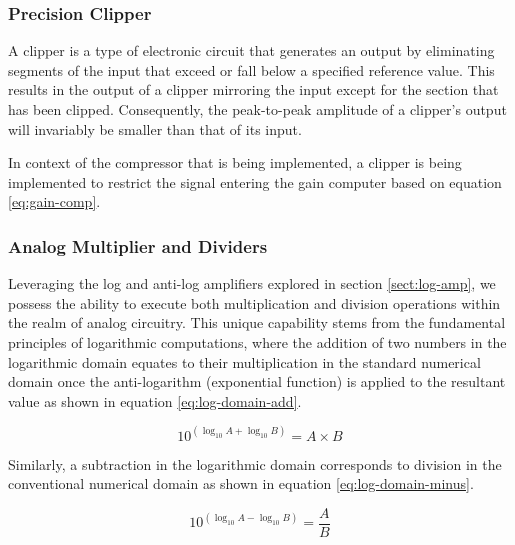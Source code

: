 \documentclass[10pt]{article}
\begin{document}
\begin{multicols*}{2}
                \subsubsection{Precision Clipper}
                    A clipper is a type of electronic circuit that generates an output by eliminating segments of the input that exceed or fall below a specified reference value. This results in the output of a clipper mirroring the input except for the section that has been clipped. Consequently, the peak-to-peak amplitude of a clipper's output will invariably be smaller than that of its input.\par
                    In context of the compressor that is being implemented, a clipper is being implemented to restrict the signal entering the gain computer based on equation \ref{eq:gain-comp}.

                \subsubsection{Analog Multiplier and Dividers} \label{sec:analog-mul-and-div}
                    Leveraging the log and anti-log amplifiers explored in section \ref{sect:log-amp}, we possess the ability to execute both multiplication and division operations within the realm of analog circuitry. This unique capability stems from the fundamental principles of logarithmic computations, where the addition of two numbers in the logarithmic domain equates to their multiplication in the standard numerical domain once the anti-logarithm (exponential function) is applied to the resultant value as shown in equation \ref{eq:log-domain-add}.
                    
                        \begin{equation} \label{eq:log-domain-add}
                            10^{(\log_{10}A+\log_{10}B)}=A\times B
                        \end{equation}
                    
                    \noindent Similarly, a subtraction in the logarithmic domain corresponds to division in the conventional numerical domain as shown in equation \ref{eq:log-domain-minus}.

                        \begin{equation} \label{eq:log-domain-minus}
                            10^{(\log_{10}A-\log_{10}B)}=\frac{A}{B}
                        \end{equation}


\end{multicols*}
\end{document}

